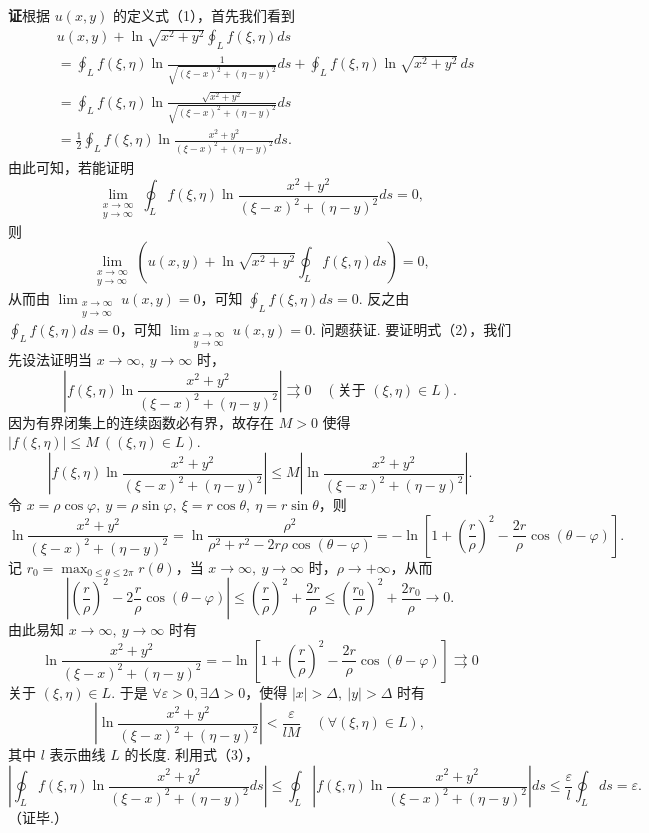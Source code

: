 \documentclass[UTF8, 12pt, fontset=fandol, oneside]{ctexart}
\begin{document}
\noindent\textbf{证}\quad 根据 $u(x,y)$ 的定义式（1），首先我们看到
\[
\begin{aligned}
&u(x,y)+\ln\sqrt{x^2+y^2}\oint_Lf(\xi,\eta)ds\\
&=\oint_Lf(\xi,\eta)\ln\frac1{\sqrt{(\xi-x)^2+(\eta-y)^2}}ds
+\oint_Lf(\xi,\eta)\ln\sqrt{x^2+y^2}\,ds\\
&=\oint_Lf(\xi,\eta)\ln
\frac{\sqrt{x^2+y^2}}{\sqrt{(\xi-x)^2+(\eta-y)^2}}ds\\
&=\frac12\oint_Lf(\xi,\eta)
\ln\frac{x^2+y^2}{(\xi-x)^2+(\eta-y)^2}ds.
\end{aligned}
\]
由此可知，若能证明
\[
\lim_{\substack{x\to\infty\\ y\to\infty}}
\oint_Lf(\xi,\eta)
\ln\frac{x^2+y^2}{(\xi-x)^2+(\eta-y)^2}ds=0, \tag{2}
\]
则
\[
\lim_{\substack{x\to\infty\\ y\to\infty}}
\left(u(x,y)+\ln\sqrt{x^2+y^2}\oint_Lf(\xi,\eta)ds\right)=0,
\]
从而由 $\displaystyle\lim_{\substack{x\to\infty\\ y\to\infty}}u(x,y)=0$，可知 $\displaystyle\oint_Lf(\xi,\eta)ds=0$. 反之由 $\displaystyle\oint_Lf(\xi,\eta)ds=0$，可知 $\displaystyle\lim_{\substack{x\to\infty\\ y\to\infty}}u(x,y)=0$. 问题获证. 要证明式（2），我们先设法证明当 $x\to\infty,\ y\to\infty$ 时，
\[
\left|f(\xi,\eta)\ln\frac{x^2+y^2}{(\xi-x)^2+(\eta-y)^2}\right|\rightrightarrows0
\quad(\text{关于 }(\xi,\eta)\in L).
\]
因为有界闭集上的连续函数必有界，故存在 $M>0$ 使得
$|f(\xi,\eta)|\le M\ ((\xi,\eta)\in L)$. 
\[
\left|f(\xi,\eta)\ln\frac{x^2+y^2}{(\xi-x)^2+(\eta-y)^2}\right|
\le M\left|\ln\frac{x^2+y^2}{(\xi-x)^2+(\eta-y)^2}\right|. \tag{3}
\]
令 $x=\rho\cos\varphi,\ y=\rho\sin\varphi,\ \xi=r\cos\theta,\ \eta=r\sin\theta$，则
\[
\ln\frac{x^2+y^2}{(\xi-x)^2+(\eta-y)^2}
=\ln\frac{\rho^2}{\rho^2+r^2-2r\rho\cos(\theta-\varphi)}
=-\ln\left[1+\left(\frac r\rho\right)^2-\frac{2r}\rho\cos(\theta-\varphi)\right].
\]
记 $r_0=\max_{0\le\theta\le2\pi}r(\theta)$，当 $x\to\infty,\ y\to\infty$ 时，$\rho\to+\infty$，从而
\[
\left|\left(\frac r\rho\right)^2-2\frac r\rho\cos(\theta-\varphi)\right|
\le\left(\frac r\rho\right)^2+\frac{2r}\rho
\le\left(\frac{r_0}\rho\right)^2+\frac{2r_0}\rho\to0.
\]
由此易知 $x\to\infty,\ y\to\infty$ 时有
\[
\ln\frac{x^2+y^2}{(\xi-x)^2+(\eta-y)^2}
=-\ln\left[1+\left(\frac r\rho\right)^2-\frac{2r}\rho\cos(\theta-\varphi)\right]\rightrightarrows0
\]
关于 $(\xi,\eta)\in L$. 于是 $\forall\varepsilon>0,\exists\Delta>0$，使得 $|x|>\Delta,\ |y|>\Delta$ 时有
\[
\left|\ln\frac{x^2+y^2}{(\xi-x)^2+(\eta-y)^2}\right|
<\frac{\varepsilon}{lM}\quad(\forall(\xi,\eta)\in L),
\]
其中 $l$ 表示曲线 $L$ 的长度. 利用式（3），
\[
\left|\oint_Lf(\xi,\eta)\ln\frac{x^2+y^2}{(\xi-x)^2+(\eta-y)^2}ds\right|
\le\oint_L\left|f(\xi,\eta)\ln\frac{x^2+y^2}{(\xi-x)^2+(\eta-y)^2}\right|ds
\le\frac{\varepsilon}{l}\oint_Lds=\varepsilon.
\]
（证毕.）
\end{document}
